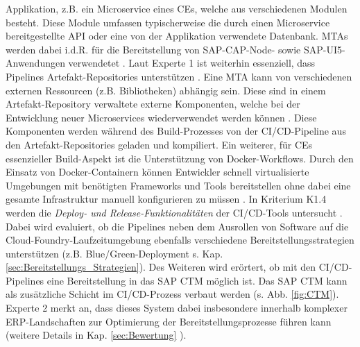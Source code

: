 Applikation, z.B. ein Microservice eines CEs, welche aus verschiedenen Modulen besteht. Diese Module umfassen typischerweise die durch einen Microservice bereitgestellte API oder eine von der Applikation verwendete Datenbank. MTAs werden dabei i.d.R. für die Bereitstellung von SAP-CAP-Node- sowie SAP-UI5-Anwendungen verwendetet \cite{.20230405b}. Laut Experte 1 ist weiterhin essenziell, dass Pipelines Artefakt-Repositories unterstützen \cite[Z. 37 ff.]{ProductOwnerSAPBTPProd&Infra.}. Eine MTA kann von verschiedenen externen Ressourcen (z.B. Bibliotheken) abhängig sein. Diese sind in einem Artefakt-Repository verwaltete externe Komponenten, welche bei der Entwicklung neuer Microservices wiederverwendet werden können \cite[Z. 40]{ProductOwnerSAPBTPProd&Infra.}. Diese Komponenten werden während des Build-Prozesses von der CI/CD-Pipeline aus den Artefakt-Repositories geladen und kompiliert. Ein weiterer, für CEs essenzieller Build-Aspekt ist die Unterstützung von Docker-Workflows. Durch den Einsatz von Docker-Containern können Entwickler schnell virtualisierte Umgebungen mit benötigten Frameworks und Tools bereitstellen ohne dabei eine gesamte Infrastruktur manuell konfigurieren zu müssen \cite{Arora.20200504}.
In Kriterium K1.4 werden die \textit{Deploy- und Release-Funktionalitäten} der CI/CD-Tools untersucht \cite[Z. 68 ff.]{ProductOwnerSAPBTPProd&Infra.}. Dabei wird evaluiert, ob die Pipelines neben dem Ausrollen von Software auf die Cloud-Foundry-Laufzeitumgebung ebenfalls verschiedene Bereitstellungsstrategien unterstützen (z.B. Blue/Green-Deployment s. Kap. \ref{sec:Bereitstellungs_Strategien}). Des Weiteren wird erörtert, ob mit den CI/CD-Pipelines eine Bereitstellung in das \ac{SAP CTM} möglich ist.
Das SAP CTM kann als zusätzliche Schicht im CI/CD-Prozess verbaut werden (s. Abb. \ref{fig:CTM}). Experte 2 merkt an, dass dieses System dabei insbesondere innerhalb komplexer ERP-Landschaften zur  Optimierung der Bereitstellungsprozesse führen kann (weitere Details in Kap. \ref{sec:Bewertung} )\cite[Z. 59]{ProductManagerSAPHyperspaceCICD.}. 

